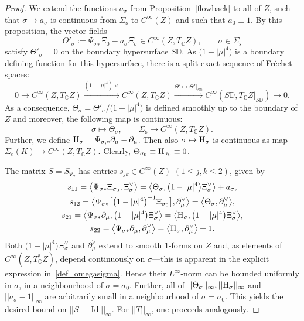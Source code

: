 \documentclass[pdftex]{sigma}
\numberwithin{equation}{section}
\theoremstyle{definition}
\newcommand{\C}{\mathbb{C}} %
\newcommand{\DD}{\mathbb{D}} %
\newcommand{\1}{{\bf 1}}
\newcommand{\Id}{\operatorname{Id}}
\begin{document}
\begin{proof}
We extend the functions $a_\sigma$ from Proposition~\ref{flowback} to all of $Z$, such that $\sigma\mapsto a_\sigma$ is continuous from $\Sigma_\mathrm{s}$ to $C^\infty(Z)$ and such that $a_0\equiv 1$. By this proposition, the vector fields
 \[
	\Theta'_\sigma:={\Psi_\sigma}_*\Xi_0 - a_\sigma \Xi_\sigma \in C^\infty(Z,T_\C Z),\qquad \sigma\in \Sigma_\mathrm{s}
\]	
satisfy $\Theta'_\sigma = 0$ on the boundary hypersurface $S\DD$. As $\bigl(1-|\mu|^4\bigr)$ is a boundary defining function for this hypersurface, there is a split exact sequence of Fr{\'e}chet spaces:
\[
0\rightarrow C^\infty(Z,T_\C Z)\xrightarrow{(1-|\mu|^4)\times }C^\infty(Z,T_\C Z)\xrightarrow{\Theta' \mapsto \Theta' |_{S\DD}} C^\infty(S\DD, T_\C Z|_{S\DD}) \rightarrow 0.
\]
As a consequence, $\Theta_\sigma =\Theta'_\sigma/ \bigl(1-|\mu|^4\bigr)$ is defined smoothly up to the boundary of $Z$ and moreover, the following map is continuous:
\[
	\sigma\mapsto \Theta_\sigma,\qquad \Sigma_\mathrm{s}\rightarrow C^\infty(Z,T_\C Z).
\]
Further, we define $\rm H_\sigma = \Psi_{\sigma,*}\partial_\mu - \partial_\mu$. Then also $\sigma\mapsto {\rm H}_\sigma$ is continuous as map $\Sigma_\mathrm{s}(K)\rightarrow C^\infty(Z,T_\C Z)$. Clearly, $\Theta_{\sigma_0} \equiv {\rm H}_{\sigma_0} \equiv 0$.


The matrix $S=S_{\Psi_\sigma}$ has entries $s_{jk}\in C^\infty(Z)$ $(1\le j,k\le 2)$, given by
\begin{gather*}
s_{11} = \big\langle \Psi_{\sigma*} \Xi_{\sigma_0}, \Xi_\sigma^\vee\big\rangle = \big\langle \Theta_\sigma,  \bigl(1-|\mu |^4\bigr)\Xi_\sigma^\vee\big\rangle + a_\sigma,\\
s_{12} = \big\langle \Psi_{\sigma*} \big[\bigl(1-|\mu|^4\bigr)^{-1} \Xi_{\sigma_0}\big], \partial_\mu^\vee\big\rangle = \big\langle \Theta_\sigma, \partial_\mu^\vee\big\rangle, \\
s_{21} = \big\langle \Psi_{\sigma*} \partial_\mu, \bigl(1-|\mu|^4\bigr)\Xi_\sigma^\vee\big\rangle = \big\langle {\rm H}_\sigma, \bigl(1-|\mu|^4\bigr) \Xi_\sigma^\vee\big\rangle,\\
s_{22} = \big\langle \Psi_{\sigma*} \partial_\mu, \partial_
\mu^\vee\big\rangle = \big\langle {\rm H}_\sigma, \partial_\mu^\vee\big\rangle + 1.
\end{gather*}
Both $\bigl(1-|\mu|^4\bigr)\Xi_\sigma^\vee$ and $\partial_\mu^\vee$ extend to smooth $1$-forms on $Z$ and, as elements of $C^\infty(Z,T^*_\C Z)$, depend continuously on $\sigma$---this is apparent in the explicit expression in~\eqref{def_omegasigma}.
 Hence their $L^\infty$-norm can be bounded uniformly in $\sigma$, in a neighbourhood of $\sigma =\sigma_0$. Further, all of $|| \Theta_\sigma ||_{\infty}, ||{\rm H}_\sigma ||_\infty $ and $||a_\sigma -1 ||_\infty$ are arbitrarily small in a neighbourhood of
$\sigma=\sigma_0$. This yields the desired bound on $||S-\Id||_\infty$. For $||T||_\infty$, one proceeds analogously.
\end{proof}
\end{document}
